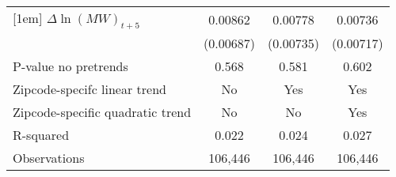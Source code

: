 {\begin{tabular}{l*{3}{c}}
[1em]
$\Delta \ln(MW)_{t+5}$&  0.00862         &  0.00778         &  0.00736         \\
          &(0.00687)         &(0.00735)         &(0.00717)         \\
\hline
P-value no pretrends&    0.568         &    0.581         &    0.602         \\
Zipcode-specifc linear trend&       No         &      Yes         &      Yes         \\
Zipcode-specific quadratic trend&       No         &       No         &      Yes         \\
R-squared &    0.022         &    0.024         &    0.027         \\
Observations&  106,446         &  106,446         &  106,446         \\
\hline\hline
\end{tabular}
}
